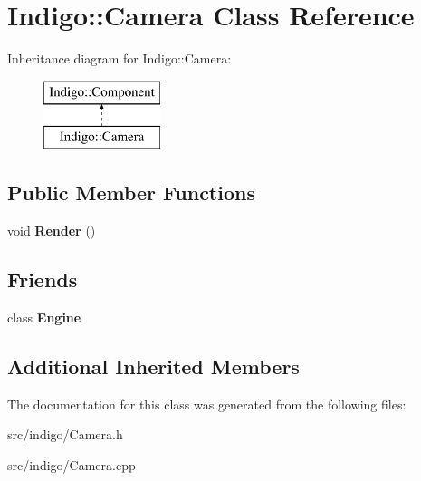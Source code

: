 \hypertarget{class_indigo_1_1_camera}{}\section{Indigo\+:\+:Camera Class Reference}
\label{class_indigo_1_1_camera}
Inheritance diagram for Indigo\+:\+:Camera\+:\begin{figure}[H]
\begin{center}
\leavevmode
\includegraphics[height=2.000000cm]{class_indigo_1_1_camera}
\end{center}
\end{figure}
\subsection*{Public Member Functions}
\begin{DoxyCompactItemize}
\item 
\mbox{\label{class_indigo_1_1_camera_ab99417d5df5a3126910d9b027a9af24b}} 
void {\bfseries Render} ()
\end{DoxyCompactItemize}
\subsection*{Friends}
\begin{DoxyCompactItemize}
\item 
\mbox{\label{class_indigo_1_1_camera_a3e1914489e4bed4f9f23cdeab34a43dc}} 
class {\bfseries Engine}
\end{DoxyCompactItemize}
\subsection*{Additional Inherited Members}


The documentation for this class was generated from the following files\+:\begin{DoxyCompactItemize}
\item 
src/indigo/Camera.\+h\item 
src/indigo/Camera.\+cpp\end{DoxyCompactItemize}
